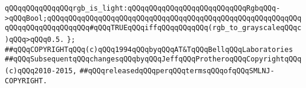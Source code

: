\newline
\verb|qQQqqQQqqQQqqQQqrgb_is_light:qQQqqQQqqQQqqQQqqQQqqQQqqQQqRgbqQQq->qQQqBool;qQQqqQQqqQQqqQQqqQQqqQQqqQQqqQQqqQQqqQQqqQQqqQQqqQQqqQQqqQQqqQQqqQQqqQQqqQQqqQQq#qQQqTRUEqQQqiffqQQqqQQqqQQq(rgb_to_grayscaleqQQqc)qQQq>qQQq0.5.|\newline
\verb|};|\newline
\newline
\newline
\verb|##qQQqCOPYRIGHTqQQq(c)qQQq1994qQQqbyqQQqAT&TqQQqBellqQQqLaboratories|\newline
\verb|##qQQqSubsequentqQQqchangesqQQqbyqQQqJeffqQQqProtheroqQQqCopyrightqQQq(c)qQQq2010-2015,|\newline
\verb|##qQQqreleasedqQQqperqQQqtermsqQQqofqQQqSMLNJ-COPYRIGHT.|\newline

